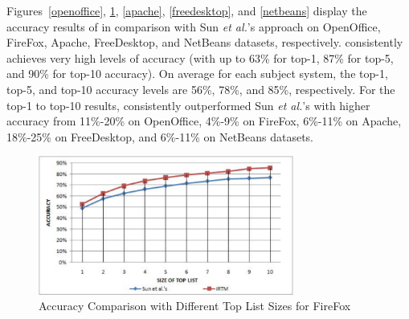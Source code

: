 
Figures~\ref{openoffice}, \ref{firefox}, \ref{apache},
\ref{freedesktop}, and \ref{netbeans} display the accuracy results of
{\model} in comparison with Sun {\em et al.}'s approach on OpenOffice,
FireFox, Apache, FreeDesktop, and NetBeans datasets,
respectively. {\model} consistently achieves very high levels of
accuracy (with up to 63\% for top-1, 87\% for top-5, and 90\% for
top-10 accuracy). On average for each subject system, the top-1,
top-5, and top-10 accuracy levels are 56\%, 78\%, and 85\%,
respectively. For the top-1 to top-10 results, {\model} consistently
outperformed Sun {\em et al.}'s with higher accuracy from 11\%-20\% on
OpenOffice, 4\%-9\% on FireFox, 6\%-11\% on Apache, 18\%-25\% on
FreeDesktop, and 6\%-11\% on NetBeans datasets.



\begin{figure}[t]
\centering
\includegraphics[width=3.3in]{firefox2}
\caption{Accuracy Comparison with Different Top List Sizes for FireFox}
\label{firefox}
\end{figure}


